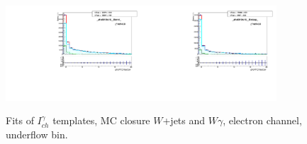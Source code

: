 \begin{figure}[htb]
  \begin{center}
   \includegraphics[width=0.45\textwidth]{../figs/figs_v11/ELECTRON_WGamma/MCclosureWjetsPlusWg/c_TEMPL_CHISO_UNblind__phoEt10to15__Barrel__RooFit_MCclosure.pdf}\includegraphics[width=0.45\textwidth]{../figs/figs_v11/ELECTRON_WGamma/MCclosureWjetsPlusWg/c_TEMPL_CHISO_UNblind__phoEt10to15__Endcap__RooFit_MCclosure.pdf}\\
  \label{fig:templateFits_MCclosureWjetsPlusWg_CHISO_ELECTRON_0}
  \caption{Fits of $I_{ch}^{\gamma}$ templates, MC closure $W$+jets and $W\gamma$, electron channel, underflow bin.}
  \end{center}
\end{figure}

